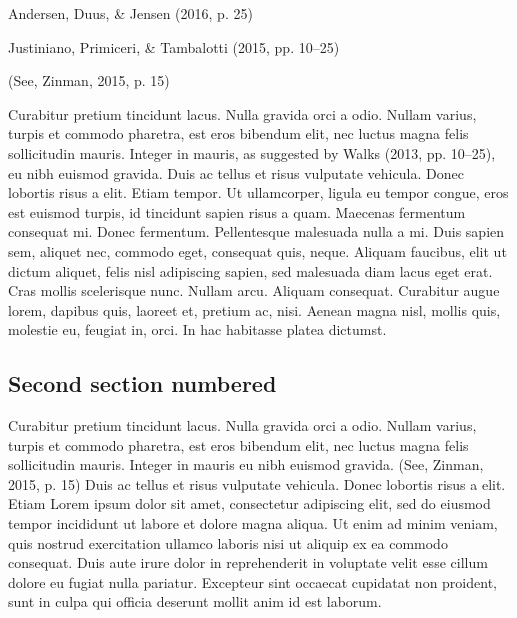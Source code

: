 \documentclass[10pt,twoside]{article}
\begin{document}
Andersen, Duus, \& Jensen (2016, p. 25)

Justiniano, Primiceri, \& Tambalotti (2015, pp. 10--25)

(See, Zinman, 2015, p. 15)

Curabitur pretium tincidunt lacus. Nulla gravida orci a odio. Nullam
varius, turpis et commodo pharetra, est eros bibendum elit, nec luctus
magna felis sollicitudin mauris. Integer in mauris, as suggested by
Walks (2013, pp. 10--25), eu nibh euismod gravida. Duis ac tellus et
risus vulputate vehicula. Donec lobortis risus a elit. Etiam tempor. Ut
ullamcorper, ligula eu tempor congue, eros est euismod turpis, id
tincidunt sapien risus a quam. Maecenas fermentum consequat mi. Donec
fermentum. Pellentesque malesuada nulla a mi. Duis sapien sem, aliquet
nec, commodo eget, consequat quis, neque. Aliquam faucibus, elit ut
dictum aliquet, felis nisl adipiscing sapien, sed malesuada diam lacus
eget erat. Cras mollis scelerisque nunc. Nullam arcu. Aliquam consequat.
Curabitur augue lorem, dapibus quis, laoreet et, pretium ac, nisi.
Aenean magna nisl, mollis quis, molestie eu, feugiat in, orci. In hac
habitasse platea dictumst.

\hypertarget{sec:part1-sec2}{%
\subsection{Second section numbered}\label{sec:part1-sec2}}

Curabitur pretium tincidunt lacus. Nulla gravida orci a odio. Nullam
varius, turpis et commodo pharetra, est eros bibendum elit, nec luctus
magna felis sollicitudin mauris. Integer in mauris eu nibh euismod
gravida. (See, Zinman, 2015, p. 15) Duis ac tellus et risus vulputate
vehicula. Donec lobortis risus a elit. Etiam Lorem ipsum dolor sit amet,
consectetur adipiscing elit, sed do eiusmod tempor incididunt ut labore
et dolore magna aliqua. Ut enim ad minim veniam, quis nostrud
exercitation ullamco laboris nisi ut aliquip ex ea commodo consequat.
Duis aute irure dolor in reprehenderit in voluptate velit esse cillum
dolore eu fugiat nulla pariatur. Excepteur sint occaecat cupidatat non
proident, sunt in culpa qui officia deserunt mollit anim id est laborum.

\FloatBarrier
\cleardoublepage

\end{document}
